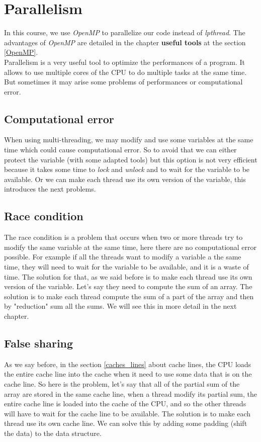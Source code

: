 \documentclass[12pt, openany]{report}
\theoremstyle{definition}
\begin{document}
\section{Parallelism}
In this course, we use \textit{OpenMP} to parallelize our code instead of \textit{lpthread}. The advantages of \textit{OpenMP} are detailed in the chapter \textbf{useful tools} at the section \ref{OpenMP}.\\ 
Parallelism is a very useful tool to optimize the performances of a program. It allows to use multiple cores of the CPU to do multiple tasks at the same time. But sometimes it may arise some problems of performances or computational error.
\subsection{Computational error}
When using multi-threading, we may modify and use some variables at the same time which could cause computational error. So to avoid that we can either protect the variable (with some adapted tools) but this option is not very efficient because it takes some time to \textit{lock} and \textit{unlock} and to wait for the variable to be available. Or we can make each thread use its own version of the variable, this introduces the next problems.
\subsection{Race condition}
The race condition is a problem that occurs when two or more threads try to modify the same variable at the same time, here there are no computational error possible. For example if all the threads want to modify a variable a the same time, they will need to wait for the variable to be available, and it is a waste of time. The solution for that, as we said before is to make each thread use its own version of the variable. Let's say they need to compute the sum of an array. The solution is to make each thread compute the sum of a part of the array and then by "reduction" sum all the sums. We will see this in more detail in the next chapter.
\subsection{False sharing}
As we say before, in the section \ref{caches_lines} about cache lines, the CPU loads the entire cache line into the cache when it need to use some data that is on the cache line. So here is the problem, let's say that all of the partial sum of the array are stored in the same cache line, when a thread modify its partial sum, the entire cache line is loaded into the cache of the CPU, and so the other threads will have to wait for the cache line to be available. The solution is to make each thread use its own cache line. We can solve this by adding some padding (shift the data) to the data structure.
\end{document}
